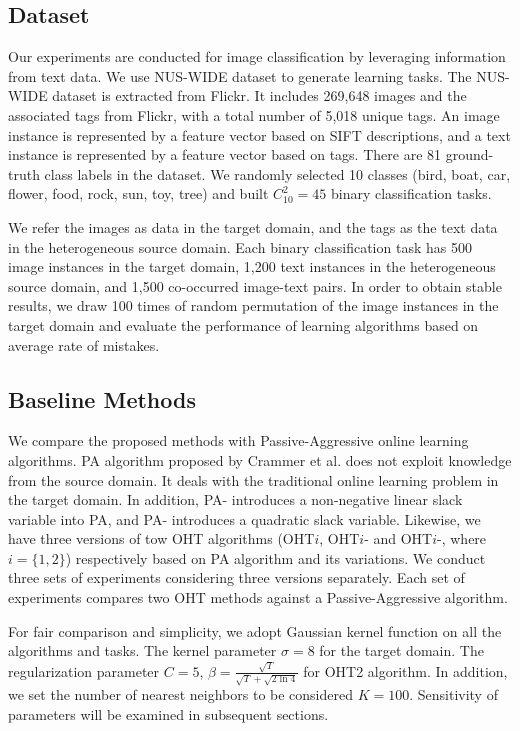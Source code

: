 \documentclass[letterpaper]{article}
\begin{document}
\subsection{Dataset}
Our experiments are conducted for image classification by leveraging information from text data.
We use NUS-WIDE dataset to generate learning tasks.
The NUS-WIDE dataset is extracted from Flickr.
It includes 269,648 images and the associated tags from Flickr, with a total number of 5,018 unique tags.
An image instance is represented by a feature vector based on SIFT descriptions, and a text instance is represented by a feature vector based on tags.
There are 81 ground-truth class labels in the dataset.
We randomly selected 10 classes (bird, boat, car, flower, food, rock, sun, toy, tree) and built $C_{10}^{2} = 45$ binary classification tasks.

We refer the images as data in the target domain, and the tags as the text data in the heterogeneous source domain.
Each binary classification task has 500 image instances in the target domain, 1,200 text instances in the heterogeneous source domain, and 1,500 co-occurred image-text pairs.
In order to obtain stable results, we draw 100 times of random permutation of the image instances in the target domain and evaluate the performance of learning algorithms based on average rate of mistakes.

\subsection{Baseline Methods}
We compare the proposed methods with Passive-Aggressive online learning algorithms.
PA algorithm proposed by Crammer et al. does not exploit knowledge from the source domain.
It deals with the traditional online learning problem in the target domain.
In addition, PA-\uppercase\expandafter{} introduces a non-negative linear slack variable into PA, and PA-\uppercase\expandafter{} introduces a quadratic slack variable.
Likewise, we have three versions of tow OHT algorithms (OHT$i$, OHT$i$-\uppercase\expandafter{} and OHT$i$-\uppercase\expandafter{}, where $i=\{1,2\}$) respectively based on PA algorithm and its variations.
We conduct three sets of experiments considering three versions separately.
Each set of experiments compares two OHT methods against a Passive-Aggressive algorithm.

For fair comparison and simplicity, we adopt Gaussian kernel function on all the algorithms and tasks.
The kernel parameter $\sigma = 8$ for the target domain.
The regularization parameter $C = 5$, $ \beta = \frac{\sqrt{T}}{\sqrt{T}+\sqrt{2\ln{4}}} $ for OHT2 algorithm.
In addition, we set the number of nearest neighbors to be considered $K = 100$.
Sensitivity of parameters will be examined in subsequent sections.
\end{document}
